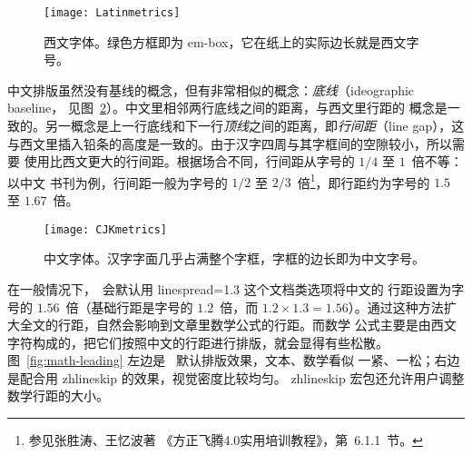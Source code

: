 \documentclass[zihao=5,no-math,a4paper]{ctexart}
\newcommand\pkg[1]{{\normalfont\ttfamily#1}}
\newcommand\opt[1]{{\normalfont\ttfamily#1}}
\begin{document}
\begin{figure}[h]
\centering
\texttt{[image: Latinmetrics]}
\caption[西文字体]{西文字体。绿色方框即为 em-box，它在纸上的实际边长就是西文字号。}
\label{fig:eng-font-size}
\end{figure}

中文排版虽然没有基线的概念，但有非常相似的概念：\emph{底线}（ideographic baseline，
见图~\ref{fig:chi-font-size}）。中文里相邻两行底线之间的距离，与西文里行距的
概念是一致的。另一概念是上一行底线和下一行\emph{顶线}之间的距离，即\emph{行间距}（line
gap），这与西文里插入铅条的高度是一致的。由于汉字四周与其字框间的空隙较小，所以需要
使用比西文更大的行间距。根据场合不同，行间距从字号的 $1/4$ 至 $1$~倍不等：以中文
书刊为例，行间距一般为字号的 $1/2$ 至 $2/3$~倍\footnote{参见张胜涛、王忆波著
《方正飞腾4.0实用培训教程》，第~6.1.1~节。}，即行距约为字号的 $1.5$ 至 $1.67$~倍。

\begin{figure}[h]
\centering
\texttt{[image: CJKmetrics]}
\caption[中文字体]{中文字体。汉字字面几乎占满整个字框，字框的边长即为中文字号。}
\label{fig:chi-font-size}
\end{figure}

在一般情况下，\CTeX\ 会默认用 \opt{linespread=1.3} 这个文档类选项将中文的
行距设置为字号的 $1.56$~倍（基础行距是字号的 $1.2$~倍，而 $1.2 \times 1.3
= 1.56$）。通过这种方法扩大全文的行距，自然会影响到文章里数学公式的行距。而数学
公式主要是由西文字符构成的，把它们按照中文的行距进行排版，就会显得有些松散。
图~\ref{fig:math-leading} 左边是 \CTeX\ 默认排版效果，文本、数学看似
一紧、一松；右边是配合用 \pkg{zhlineskip} 的效果，视觉密度比较均匀。
\pkg{zhlineskip} 宏包还允许用户调整数学行距的大小。
\end{document}
